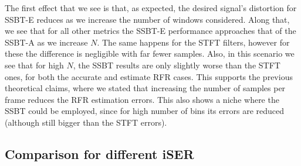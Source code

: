 The first effect that we see is that, as expected, the desired signal's distortion for SSBT-E reduces as we increase the number of windows considered. Along that, we see that for all other metrics the SSBT-E performance approaches that of the SSBT-A as we increase $N$. The same happens for the STFT filters, however for these the difference is negligible with far fewer samples. Also, in this scenario we see that for high $N$, the SSBT results are only slightly worse than the STFT ones, for both the accurate and estimate RFR cases. This supports the previous theoretical claims, where we stated that increasing the number of samples per frame reduces the RFR estimation errors. This also shows a niche where the SSBT could be employed, since for high number of bins its errors are reduced (although still bigger than the STFT errors).


\subsection{Comparison for different iSER}

